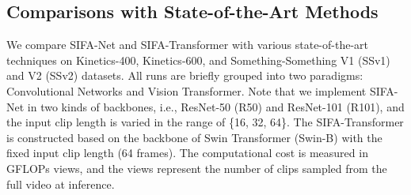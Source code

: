 \documentclass[10pt,twocolumn,letterpaper]{article}
\begin{document}
\subsection{Comparisons with State-of-the-Art Methods}
We compare SIFA-Net and SIFA-Transformer with various state-of-the-art techniques on Kinetics-400, Kinetics-600, and Something-Something V1 (SSv1) and V2 (SSv2) datasets. All runs are briefly grouped into two paradigms: Convolutional Networks and Vision Transformer.
Note that we implement SIFA-Net in two kinds of backbones, i.e., ResNet-50 (R50) and ResNet-101 (R101), and the input clip length is varied in the range of \{16, 32, 64\}.
The SIFA-Transformer is constructed based on the backbone of Swin Transformer (Swin-B) with the fixed input clip length (64 frames).
The computational cost is measured in GFLOPs  views, and the views represent the number of clips sampled from the full video at inference.
\end{document}
